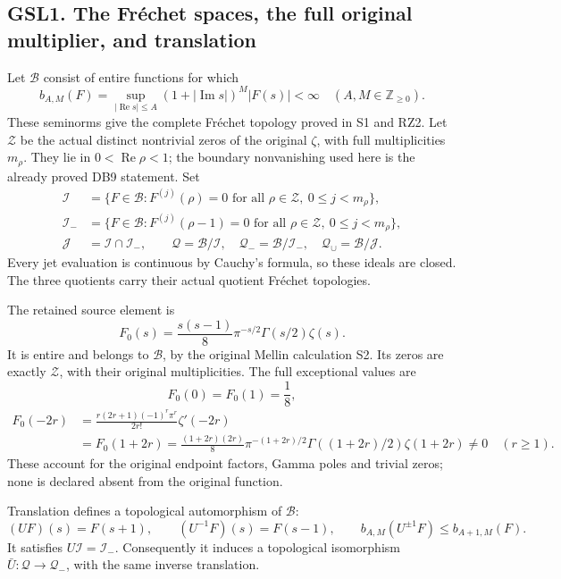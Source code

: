 \subsection{GSL1. The Fréchet spaces, the full original multiplier, and
translation}\label{gsl1.-the-fruxe9chet-spaces-the-full-original-multiplier-and-translation}

Let \(\mathcal B\) consist of entire functions for which \[
b_{A,M}(F)=\sup_{|\operatorname{Re}s|\le A}
 (1+|\operatorname{Im}s|)^M|F(s)|<\infty
 \quad(A,M\in\mathbb Z_{\ge0}).
\tag{GSL1.1}
\] These seminorms give the complete Fréchet topology proved in S1 and
RZ2. Let \(\mathscr Z\) be the actual distinct nontrivial zeros of the
original \(\zeta\), with full multiplicities \(m_\rho\). They lie in
\(0<\operatorname{Re}\rho<1\); the boundary nonvanishing used here is
the already proved DB9 statement. Set \[
\begin{aligned}
\mathcal I&=\{F\in\mathcal B:F^{(j)}(\rho)=0
       \text{ for all }\rho\in\mathscr Z,\ 0\le j<m_\rho\},\\
\mathcal I_-&=\{F\in\mathcal B:F^{(j)}(\rho-1)=0
       \text{ for all }\rho\in\mathscr Z,\ 0\le j<m_\rho\},\\
\mathcal J&=\mathcal I\cap\mathcal I_-,\qquad
\mathcal Q=\mathcal B/\mathcal I,\quad
\mathcal Q_- =\mathcal B/\mathcal I_-,\quad
\mathcal Q_{\cup}=\mathcal B/\mathcal J.
\end{aligned}
\tag{GSL1.2}
\] Every jet evaluation is continuous by Cauchy's formula, so these
ideals are closed. The three quotients carry their actual quotient
Fréchet topologies.

The retained source element is \[
F_0(s)=\frac{s(s-1)}8\pi^{-s/2}\Gamma(s/2)\zeta(s).
\tag{GSL1.3}
\] It is entire and belongs to \(\mathcal B\), by the original Mellin
calculation S2. Its zeros are exactly \(\mathscr Z\), with their
original multiplicities. The full exceptional values are \[
F_0(0)=F_0(1)=\frac18,
\tag{GSL1.4}
\] \[
\begin{aligned}
F_0(-2r)
 &=\frac{r(2r+1)(-1)^r\pi^r}{2r!}\zeta'(-2r)\\
 &=F_0(1+2r)
 =\frac{(1+2r)(2r)}8\pi^{-(1+2r)/2}
       \Gamma((1+2r)/2)\zeta(1+2r)\ne0\quad(r\ge1).
\end{aligned}
\tag{GSL1.5}
\] These account for the original endpoint factors, Gamma poles and
trivial zeros; none is declared absent from the original function.

Translation defines a topological automorphism of \(\mathcal B\): \[
(UF)(s)=F(s+1),\qquad (U^{-1}F)(s)=F(s-1),\qquad
b_{A,M}(U^{\pm1}F)\le b_{A+1,M}(F).
\tag{GSL1.6}
\] It satisfies \(U\mathcal I=\mathcal I_-\). Consequently it induces a
topological isomorphism \(\bar U:\mathcal Q\to\mathcal Q_-\), with the
same inverse translation.


